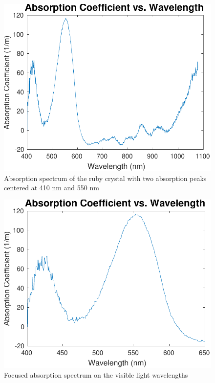 \documentclass[11pt, a4paper, twocolumn]{article}
\begin{document}
\begin{figure}[H]
\includegraphics[width=\linewidth]{absorptionSpectrum.pdf}
\caption{Absorption spectrum of the ruby crystal with two absorption peaks centered at 410 nm and 550 nm}
\label{fig:intensities}
\end{figure}

\begin{figure}[H]
\includegraphics[width=\linewidth]{absorptionSpectrumFocused.pdf}
\caption{Focused absorption spectrum on the visible light wavelengths}
\label{fig:intensities}
\end{figure}
\end{document}
